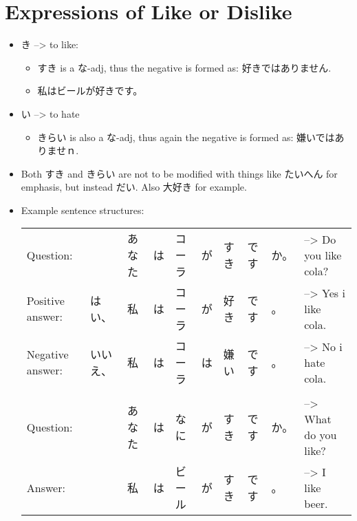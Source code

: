 \documentclass{article}
\newcommand\tab[1][1cm]{\hspace*{#1}}
\begin{document}
\section{Expressions of Like or Dislike}
\begin{itemize}
\item {}き --> to like:
\begin{itemize}
\item すき is a な-adj, thus the negative is formed as: 好きではありません.
\item 私はビールが好きです。
\end{itemize}
\item {}い --> to hate
\begin{itemize}
\item きらい is also a な-adj, thus again the negative is formed as: 嫌いではありませｎ.
\end{itemize}
\item Both すき and きらい are not to be modified with things like たいへん for emphasis, but instead だい. Also 大好き for example.
\item Example sentence structures:\\
\begin{tabular}{ l l l l l l l l l l }
Question:&&あなた&は&コーラ&\color{orange}が&すき&です&か。& --> Do you like cola? \\
Positive answer:&はい、&私&は&コーラ&\color{orange}が&好き&です&。& --> Yes i like cola. \\
Negative answer:&いいえ、&私&は&コーラ&\color{blue}は&嫌い&です&。& --> No i hate cola. \\ \\
Question:&&あなた&は&なに&\color{orange}が&すき&です&か。& --> What do you like? \\
Answer:&&私&は&ビール&\color{orange}が&すき&です&。& --> I like beer. \\
\end{tabular}
\end{itemize}
\end{document}
